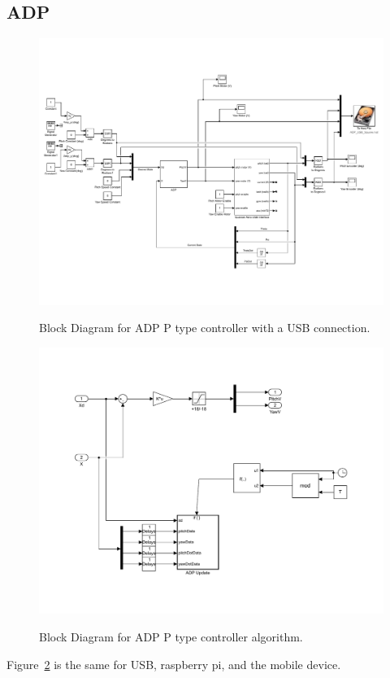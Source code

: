 \subsection{ADP}
\begin{figure}[!htbp]
    \centering
    \includegraphics[width=.8\textwidth,keepaspectratio=true]{figs/img/ADP_USB}
    \label{fig:ADP_P_USB_Block_Diagram}
    \caption{Block Diagram for ADP P type controller with a USB connection.}
\end{figure}
\begin{figure}[!htbp]
    \centering
    \includegraphics[width=.8\textwidth,keepaspectratio=true]{figs/img/ADP_Black_Box}
    \label{fig:ADP_P_BlackBox}
    \caption{Block Diagram for ADP P type controller algorithm.}
\end{figure}
Figure~\ref{fig:ADP_P_BlackBox} is the same for USB, raspberry pi, and the mobile device.
